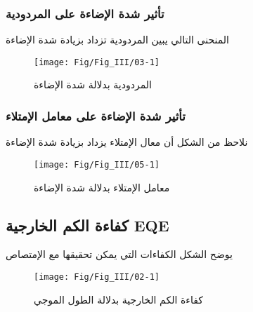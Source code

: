 \FloatBarrier
 \subsubsection{ تأثير شدة الإضاءة  على  المردودية}
 المنحنى التالي  يبين  المردودية تزداد بزيادة شدة الإضاءة 
 \begin{figure}[h!]
 	\centering
 	\texttt{[image: Fig/Fig\_III/03-1]}
 	\caption{المردودية بدلالة  شدة الإضاءة}
 	\label{fig:03-1}
 \end{figure}
 \FloatBarrier
\subsubsection{ تأثير   شدة الإضاءة على   معامل الإمتلاء}
نلاحظ من الشكل أن معال الإمتلاء يزداد بزيادة شدة الإضاءة 
\begin{figure}[h!]
	\centering
	\texttt{[image: Fig/Fig\_III/05-1]}
	\caption{معامل الإمتلاء بدلالة شدة الإضاءة}
	\label{fig:05-1}
\end{figure}
\FloatBarrier
\subsection{ كفاءة الكم الخارجية EQE }
يوضح الشكل الكفاءات التي يمكن تحقيقها مع الإمتصاص 
\begin{figure}[h!]
	\centering
	\texttt{[image: Fig/Fig\_III/02-1]}
	\caption{كفاءة الكم الخارجية بدلالة الطول الموجي}
	\label{fig:02-1}
\end{figure}
\FloatBarrier